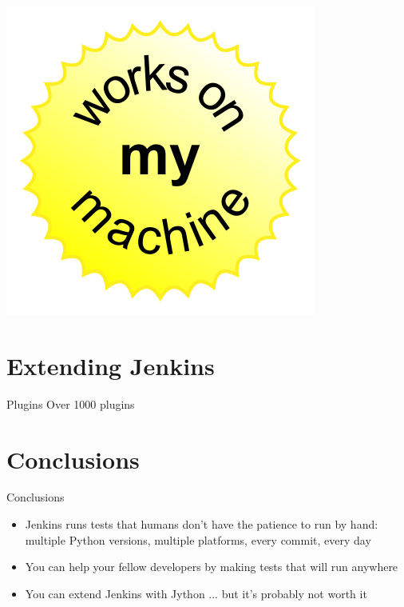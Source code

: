 \documentclass[xcolor=svgnames,17pt]{beamer}
\begin{document}
\begin{frame}[plain]{}
\includegraphics[height=0.95\paperheight,center]{works-on-my-machine.pdf}
\end{frame}

\section{Extending Jenkins}

\begin{frame}{}
\tableofcontents[currentsection]
\end{frame}

\begin{frame}{Plugins}
Over 1000 plugins
\end{frame}

\section{Conclusions}

\begin{frame}{}
\tableofcontents[currentsection]
\end{frame}

\begin{frame}{Conclusions}
\begin{itemize}
\item Jenkins runs tests that humans don’t have the patience to run by
hand: multiple Python versions, multiple platforms, every commit, every day
\pause
\item You can help your fellow developers by making tests that will run
anywhere
\pause
\item You can extend Jenkins with Jython ...
\pause but it’s probably not worth it
\end{itemize}
\end{frame}
\end{document}
